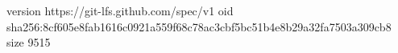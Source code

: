 version https://git-lfs.github.com/spec/v1
oid sha256:8cf605e8fab1616c0921a559f68c78ac3cbf5bc51b4e8b29a32fa7503a309cb8
size 9515
